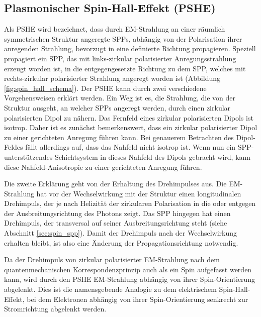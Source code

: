 \documentclass[titlepage,  ngerman]{article}
\begin{document}
	\subsection{Plasmonischer Spin-Hall-Effekt (PSHE)}
	Als PSHE wird bezeichnet, dass durch EM-Strahlung an einer räumlich symmetrischen Struktur angeregte SPPs, abhängig von der Polarisation ihrer anregenden Strahlung, bevorzugt in eine definierte Richtung propagieren. Speziell propagiert ein SPP, das mit links-zirkular polarisierter Anregungsstrahlung erzeugt worden ist, in die entgegengesetzte Richtung zu dem SPP, welches mit rechts-zirkular polarisierter Strahlung angeregt worden ist (Abbildung \ref{fig:spin_hall_schema}). Der PSHE kann durch zwei verschiedene Vorgehensweisen erklärt werden. Ein Weg ist es, die Strahlung, die von der Struktur ausgeht, an welcher SPPs angeregt werden, durch einen zirkular polarisierten Dipol zu nähern. Das Fernfeld eines zirkular polarisierten Dipols ist isotrop. Daher ist es zunächst bemerkenswert, dass ein zirkular polarisierter Dipol zu einer gerichteten Anregung führen kann. Bei genauerem Betrachten des Dipol-Feldes fällt allerdings auf, dass das Nahfeld nicht isotrop ist. Wenn nun ein SPP-unterstützendes Schichtsystem in dieses Nahfeld des Dipols gebracht wird, kann diese Nahfeld-Anisotropie zu einer gerichteten Anregung führen.
	
	Die zweite Erklärung geht von der Erhaltung des Drehimpulses aus. Die EM-Strahlung hat vor der Wechselwirkung mit der Struktur einen longitudinalen Drehimpuls, der je nach Helizität der zirkularen Polarisation in die oder entgegen der Ausbreitungsrichtung des Photons zeigt. Das SPP hingegen hat einen Drehimpuls, der transversal auf seiner Ausbreitungsrichtung steht (siehe Abschnitt \ref{sec:spin_spp}). Damit der Drehimpuls nach der Wechselwirkung erhalten bleibt, ist also eine Änderung der Propagationsrichtung notwendig. 
	
	Da der Drehimpuls von zirkular polarisierter EM-Strahlung nach dem quantenmechanischen Korrespondenzprinzip auch als ein Spin aufgefasst werden kann, wird durch den PSHE EM-Strahlung abhängig von ihrer Spin-Orientierung abgelenkt. Dies ist die namensgebende Analogie zu dem elektrischem Spin-Hall-Effekt, bei dem Elektronen abhängig von ihrer Spin-Orientierung senkrecht zur Stromrichtung abgelenkt werden\cite{Inoue.2005}.
\end{document}
